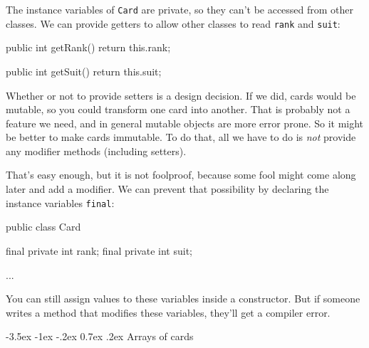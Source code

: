 \documentclass[12pt]{book}
\makeatletter
\theoremstyle{exercise}
\newcommand{\java}[1]{\verb"#1"}
\renewcommand{\section}{\@startsection{section}{1}{\z@}%
    {-3.5ex \@plus -1ex \@minus -.2ex}%
    {0.7ex \@plus.2ex}%
    {\normalfont\Large\bfseries}}
\newcommand{\java}[1]{\lstinline{#1}} %
\makeatother
\begin{document}
The instance variables of \java{Card} are private, so they can't be accessed from other classes.
We can provide getters to allow other classes to read \java{rank} and \java{suit}:

\begin{code}
    public int getRank() {
        return this.rank;
    }

    public int getSuit() {
        return this.suit;
    }
\end{code}

Whether or not to provide setters is a design decision.
If we did, cards would be mutable, so you could transform one card into another.
That is probably not a feature we need, and in general mutable objects are more error prone.
So it might be better to make cards immutable.
To do that, all we have to do is {\em not} provide any modifier methods (including setters).

That's easy enough, but it is not foolproof, because some fool might come along later and add a modifier.
We can prevent that possibility by declaring the instance variables \java{final}:

\begin{code}
public class Card {
    final private int rank;
    final private int suit;

    ...
}
\end{code}

You can still assign values to these variables inside a constructor.
But if someone writes a method that modifies these variables, they'll get a compiler error.


\section{Arrays of cards}
\label{cardarray}




\end{document}
